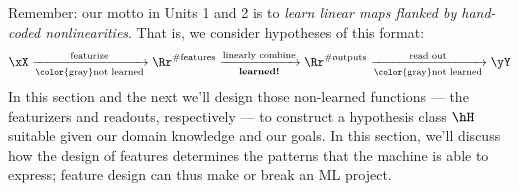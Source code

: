

  Remember: our motto in Units 1 and 2 is to \emph{learn linear maps flanked by
  hand-coded nonlinearities}.  That is, we consider hypotheses of this format:
  \[
    \xX                         \xrightarrow[\text{\color{gray}not learned}]{\text{featurize}}
    \Rr^{\# \text{features}}    \xrightarrow[\text{\textbf{learned!}}]{\text{linearly combine}}
    \Rr^{\# \text{outputs}}     \xrightarrow[\text{\color{gray}not learned}]{\text{read out}}
    \yY
  \]
  In this section and the next we'll design those non-learned functions --- the
  featurizers and readouts, respectively --- to construct a hypothesis class
  $\hH$ suitable given our domain knowledge and our goals.  In this section,
  we'll discuss how the design of features determines the patterns that the
  machine is able to express; feature design can thus make or break an ML
  project.


